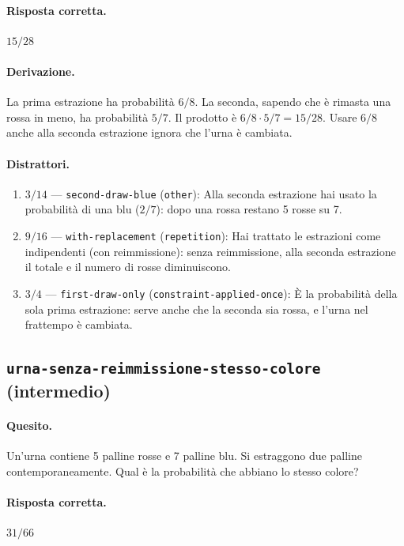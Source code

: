 \paragraph{Risposta corretta.} $15/28$

\paragraph{Derivazione.} La prima estrazione ha probabilità $6/8$. La seconda, sapendo che è rimasta una rossa in meno, ha probabilità $5/7$. Il prodotto è $6/8 \cdot  5/7 = 15/28$. Usare $6/8$ anche alla seconda estrazione ignora che l'urna è cambiata.

\paragraph{Distrattori.}
\begin{enumerate}
  \item $3/14$ --- \texttt{second-draw-blue} (\texttt{other}): Alla seconda estrazione hai usato la probabilità di una blu ($2/7$): dopo una rossa restano 5 rosse su 7.
  \item $9/16$ --- \texttt{with-replacement} (\texttt{repetition}): Hai trattato le estrazioni come indipendenti (con reimmissione): senza reimmissione, alla seconda estrazione il totale e il numero di rosse diminuiscono.
  \item $3/4$ --- \texttt{first-draw-only} (\texttt{constraint-applied-once}): È la probabilità della sola prima estrazione: serve anche che la seconda sia rossa, e l'urna nel frattempo è cambiata.
\end{enumerate}

\subsection{\texorpdfstring{\texttt{urna-senza-reimmissione-stesso-colore} (intermedio)}{urna-senza-reimmissione-stesso-colore (intermedio)}}

\paragraph{Quesito.} Un'urna contiene 5 palline rosse e 7 palline blu. Si estraggono due palline contemporaneamente. Qual è la probabilità che abbiano lo stesso colore?

\paragraph{Risposta corretta.} $31/66$

